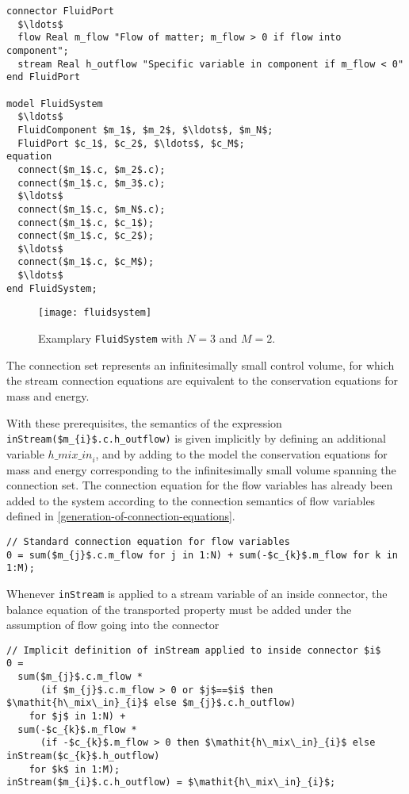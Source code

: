 \begin{lstlisting}[language=modelica]
connector FluidPort
  $\ldots$
  flow Real m_flow "Flow of matter; m_flow > 0 if flow into component";
  stream Real h_outflow "Specific variable in component if m_flow < 0"
end FluidPort

model FluidSystem
  $\ldots$
  FluidComponent $m_1$, $m_2$, $\ldots$, $m_N$;
  FluidPort $c_1$, $c_2$, $\ldots$, $c_M$;
equation
  connect($m_1$.c, $m_2$.c);
  connect($m_1$.c, $m_3$.c);
  $\ldots$
  connect($m_1$.c, $m_N$.c);
  connect($m_1$.c, $c_1$);
  connect($m_1$.c, $c_2$);
  $\ldots$
  connect($m_1$.c, $c_M$);
  $\ldots$
end FluidSystem;
\end{lstlisting}
\begin{figure}[H]
  \begin{center}
    \texttt{[image: fluidsystem]}
  \end{center}
  \caption{
    Examplary \lstinline!FluidSystem! with $N = 3$ and $M = 2$.
  }
\end{figure}

\begin{nonnormative}
The connection set represents an infinitesimally small control volume, for which the stream connection equations are equivalent to the conservation equations for mass and energy.
\end{nonnormative}

With these prerequisites, the semantics of the expression \lstinline!inStream($m_{i}$.c.h_outflow)! is given implicitly by defining an additional variable $\mathit{h\_mix\_in}_{i}$, and by adding to the model the conservation equations for mass and energy corresponding to the infinitesimally small volume spanning the connection set.
The connection equation for the flow variables has already been added to the system according to the connection semantics of flow variables defined in \cref{generation-of-connection-equations}.

\begin{lstlisting}[language=modelica]
// Standard connection equation for flow variables
0 = sum($m_{j}$.c.m_flow for j in 1:N) + sum(-$c_{k}$.m_flow for k in 1:M);
\end{lstlisting}

Whenever \lstinline!inStream! is applied to a stream variable of an inside connector, the balance equation of the transported property must be added under the assumption of flow going into the connector

\begin{lstlisting}[language=modelica]
// Implicit definition of inStream applied to inside connector $i$
0 =
  sum($m_{j}$.c.m_flow *
      (if $m_{j}$.c.m_flow > 0 or $j$==$i$ then $\mathit{h\_mix\_in}_{i}$ else $m_{j}$.c.h_outflow)
    for $j$ in 1:N) +
  sum(-$c_{k}$.m_flow *
      (if -$c_{k}$.m_flow > 0 then $\mathit{h\_mix\_in}_{i}$ else inStream($c_{k}$.h_outflow)
    for $k$ in 1:M);
inStream($m_{i}$.c.h_outflow) = $\mathit{h\_mix\_in}_{i}$;
\end{lstlisting}

